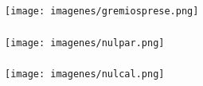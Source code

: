 \documentclass[compress]{beamer}
\begin{document}
{
\begin{frame}
\frametitle{}
\vspace{-1.5cm}
\begin{center}
\hspace*{-2cm}\texttt{[image: imagenes/gremiosprese.png]}\\
\end{center}
\end{frame}
}


{
\begin{frame}
\frametitle{}
\vspace{-0cm}
\begin{center}
\texttt{[image: imagenes/nulpar.png]}\\
\end{center}
\end{frame}
}
{
\begin{frame}
\frametitle{}
\begin{center}
\texttt{[image: imagenes/nulcal.png]}\\
\end{center}
\end{frame}
}
\end{document}
